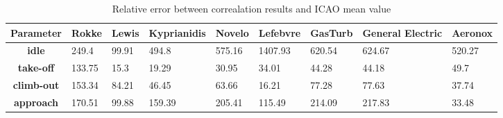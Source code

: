 \begin{table}[h!]
  \centering
  \begin{tabularx}{\textwidth}{||c|X|X|X|X|X|X|X|X||}
  \hline
    \cellcolor{gray!20}\textbf{Parameter} & \cellcolor{gray!20}\textbf{Rokke} & \cellcolor{gray!20}\textbf{Lewis} & \cellcolor{gray!20}\textbf{Kyprianidis} & \cellcolor{gray!20}\textbf{Novelo} & \cellcolor{gray!20}\textbf{Lefebvre} & \cellcolor{gray!20}\textbf{GasTurb} & \cellcolor{gray!20}\textbf{General Electric} & \cellcolor{gray!20}\textbf{Aeronox} \\ [0.5ex]
  \hline\hline
\centering
    \cellcolor{gray!20}\textbf{idle} & 249.4 & 99.91 & 494.8 & 575.16 & 1407.93 & 620.54 & 624.67 & 520.27 \\
  \hline
    \cellcolor{gray!20}\textbf{take-off} & 133.75 & 15.3 & 19.29 & 30.95 & 34.01 & 44.28 & 44.18 & 49.7 \\
  \hline
    \cellcolor{gray!20}\textbf{climb-out} & 153.34 & 84.21 & 46.45 & 63.66 & 16.21 & 77.28 & 77.63 & 37.74 \\
  \hline
    \cellcolor{gray!20}\textbf{approach} & 170.51 & 99.88 & 159.39 & 205.41 & 115.49 & 214.09 & 217.83 & 33.48 \\
  \hline
  \end{tabularx}
  \caption{Relative error between correalation results and ICAO mean value}
  \label{tab:relec}
\end{table}
